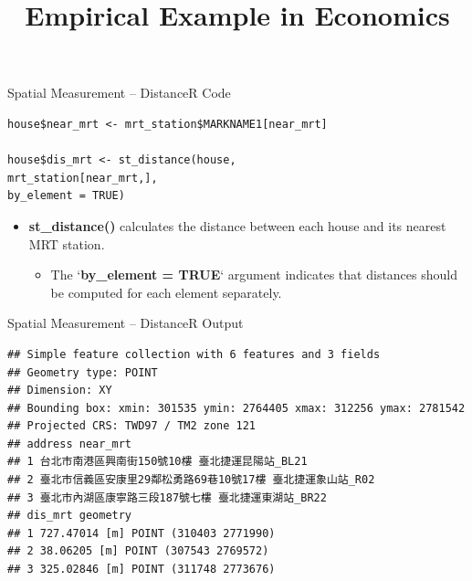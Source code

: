 \documentclass[hyperref={pdfpagelabels=false}]{beamer}
\begin{document}
\begin{frame}[fragile]{Spatial Measurement -- Distance}{R Code}
\begin{lstlisting}
house$near_mrt <- mrt_station$MARKNAME1[near_mrt]

house$dis_mrt <- st_distance(house,
mrt_station[near_mrt,],
by_element = TRUE)
\end{lstlisting}

\begin{itemize}
		\item \textbf{st\_distance()} calculates the distance between each house and its nearest MRT station.
	\vspace{0.2cm}
	\begin{itemize}
		\item The `\textbf{by\_element = TRUE}` argument indicates that distances should be computed for each element separately.
		\vspace{0.2cm}
		
	\end{itemize}
\end{itemize}
\end{frame}




\begin{frame}[fragile]{Spatial Measurement -- Distance}{R Output}

\tiny

\begin{lstlisting}
## Simple feature collection with 6 features and 3 fields
## Geometry type: POINT
## Dimension: XY
## Bounding box: xmin: 301535 ymin: 2764405 xmax: 312256 ymax: 2781542
## Projected CRS: TWD97 / TM2 zone 121
## address near_mrt
## 1 台北市南港區興南街150號10樓 臺北捷運昆陽站_BL21
## 2 臺北市信義區安康里29鄰松勇路69巷10號17樓 臺北捷運象山站_R02
## 3 臺北市內湖區康寧路三段187號七樓 臺北捷運東湖站_BR22
## dis_mrt geometry
## 1 727.47014 [m] POINT (310403 2771990)
## 2 38.06205 [m] POINT (307543 2769572)
## 3 325.02846 [m] POINT (311748 2773676)
\end{lstlisting}


\end{frame}









\title[]  
{Empirical Example in Economics}


\author 
{}

\institute{}
\end{document}
